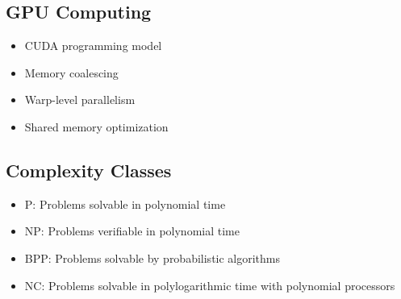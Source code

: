 \subsection{GPU Computing}
\begin{itemize}
    \item CUDA programming model
    \item Memory coalescing
    \item Warp-level parallelism
    \item Shared memory optimization
\end{itemize}

\subsection{Complexity Classes}
\begin{itemize}
    \item P: Problems solvable in polynomial time
    \item NP: Problems verifiable in polynomial time
    \item BPP: Problems solvable by probabilistic algorithms
    \item NC: Problems solvable in polylogarithmic time with polynomial processors
\end{itemize} 